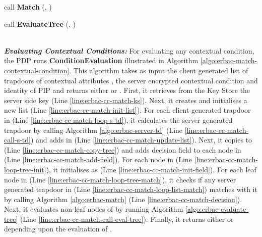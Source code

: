 \documentclass[epsfig,a4paper,11pt,titlepage]{book}
\numberwithin{algorithm}{chapter}
\newcommand{\algofontsize}{\fontsize{11}{12}\selectfont}
\begin{document}
\begin{algorithm} [htp]
{\begin{algorithmic}[1]
\EndFor

 \label{line:erbac-cc-match-loop-tree-match}
	
	 \label{line:erbac-cc-match-loop-list-match}
	
		\State  call \textbf{Match} (, ) \label{line:erbac-cc-match-decision}

		\If {} \label{line:erbac-cc-match-if-success}
		
			\State  \label{line:erbac-cc-match-stop}
			
		\EndIf  
	
	\EndFor

\EndFor

\State call \textbf{EvaluateTree} (, ) {\algofontsize {}} \label{line:erbac-cc-match-call-eval-tree}

\Return  

\end{algorithmic}
}
\end{algorithm}
\noindent \\
\noindent \emph{\textbf{Evaluating Contextual Conditions:}}
For evaluating any contextual condition, the \gls{PDP} runs \textbf{ConditionEvaluation} illustrated in Algorithm \ref{algo:erbac-match-contextual-condition}. This algorithm takes as input the client generated list of trapdoors of contextual attributes , the server encrypted contextual condition  and identity of \gls{PIP}  and returns either  or . First, it retrieves from the Key Store the server side key  (Line \ref{line:erbac-cc-match-ks}). Next, it creates and initialises a new list  (Line \ref{line:erbac-cc-match-init-list}). For each client generated trapdoor  in  (Line \ref{line:erbac-cc-match-loop-s-td}), it calculates the server generated trapdoor  by calling Algorithm \ref{algo:erbac-server-td} (Line \ref{line:erbac-cc-match-call-s-td}) and adds  in  (Line \ref{line:erbac-cc-match-update-list}). Next, it copies  to  (Line \ref{line:erbac-cc-match-copy-tree}) and adds decision field to each node in  (Line \ref{line:erbac-cc-match-add-field}). For each node  in  (Line \ref{line:erbac-cc-match-loop-tree-init}), it initialises  as  (Line \ref{line:erbac-cc-match-init-field}). For each leaf node  in  (Line \ref{line:erbac-cc-match-loop-tree-match}), it checks if any server generated trapdoor  in  (Line \ref{line:erbac-cc-match-loop-list-match}) matches with it by calling Algorithm \ref{algo:erbac-match} (Line \ref{line:erbac-cc-match-decision}). Next, it evaluates non-leaf nodes of  by running Algorithm \ref{algo:erbac-evaluate-tree} (Line \ref{line:erbac-cc-match-call-eval-tree}). Finally, it returns either  or  depending upon the evaluation of .
\end{document}
